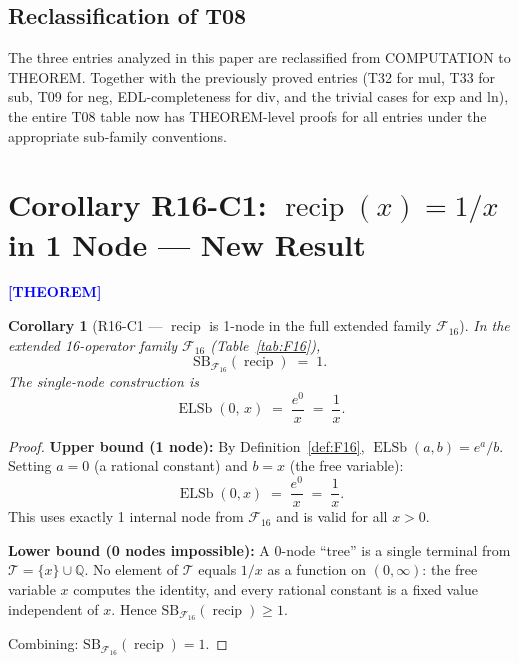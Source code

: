 \documentclass[12pt,a4paper]{article}
\newtheorem{corollary}[theorem]{Corollary}
\theoremstyle{definition}
\newcommand{\ELSb}{\operatorname{ELSb}}
\newcommand{\prooflabel}[1]{%
  \noindent\textbf{\textcolor{blue}{[#1]}}%
}
\newcommand{\F}{\mathcal{F}_{16}}
\newcommand{\SB}{\mathrm{SB}}
\newcommand{\recip}{\operatorname{recip}}
\begin{document}
\subsection{Reclassification of T08}

The three entries analyzed in this paper are reclassified from COMPUTATION to THEOREM.
Together with the previously proved entries (T32 for mul, T33 for sub, T09 for neg,
EDL-completeness for div, and the trivial cases for exp and ln), the entire T08 table
now has THEOREM-level proofs for all entries under the appropriate sub-family conventions.

\section{Corollary R16-C1: \texorpdfstring{$\recip(x) = 1/x$}{recip(x)=1/x} in 1 Node — New Result}
\label{sec:recip-1node}

\prooflabel{THEOREM}

\begin{corollary}[R16-C1 --- $\recip$ is 1-node in the full extended family $\F$]
\label{cor:recip-1node}
In the extended 16-operator family $\F$ (Table~\ref{tab:F16}),
\[
  \SB_{\F}(\recip) \;=\; 1.
\]
The single-node construction is
\[
  \ELSb(0,\, x) \;=\; \frac{e^0}{x} \;=\; \frac{1}{x}.
\]
\end{corollary}

\begin{proof}
\textbf{Upper bound (1 node):}
By Definition~\ref{def:F16}, $\ELSb(a, b) = e^a / b$.
Setting $a = 0$ (a rational constant) and $b = x$ (the free variable):
\[
  \ELSb(0, x) \;=\; \frac{e^0}{x} \;=\; \frac{1}{x}.
\]
This uses exactly 1 internal node from $\F$ and is valid for all $x > 0$.

\textbf{Lower bound (0 nodes impossible):}
A 0-node ``tree'' is a single terminal from $\mathcal{T} = \{x\} \cup \mathbb{Q}$.
No element of $\mathcal{T}$ equals $1/x$ as a function on $(0,\infty)$:
the free variable $x$ computes the identity, and every rational constant is a
fixed value independent of $x$.  Hence $\SB_{\F}(\recip) \geq 1$.

Combining: $\SB_{\F}(\recip) = 1$.
\end{proof}
\end{document}
